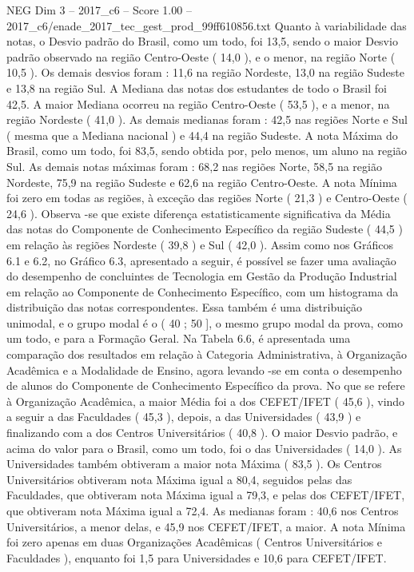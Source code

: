 \begin{textsample}{NEG Dim 3 – 2017\_c6 – Score 1.00 – 2017\_c6/enade\_2017\_tec\_gest\_prod\_99ff610856.txt}
Quanto à variabilidade das notas, o Desvio padrão do Brasil, como um todo, foi 13,5, sendo o maior Desvio padrão observado na região Centro-Oeste ( 14,0 ), e o menor, na região Norte ( 10,5 ).
Os demais desvios foram : 11,6 na região Nordeste, 13,0 na região Sudeste e 13,8 na região Sul.
A Mediana das notas dos estudantes de todo o Brasil foi 42,5.
A maior Mediana ocorreu na região Centro-Oeste ( 53,5 ), e a menor, na região Nordeste ( 41,0 ).
As demais medianas foram : 42,5 nas regiões Norte e Sul ( mesma que a Mediana nacional ) e 44,4 na região Sudeste.
A nota Máxima do Brasil, como um todo, foi 83,5, sendo obtida por, pelo menos, um aluno na região Sul.
As demais notas máximas foram : 68,2 nas regiões Norte, 58,5 na região Nordeste, 75,9 na região Sudeste e 62,6 na região Centro-Oeste.
A nota Mínima foi zero em todas as regiões, à exceção das regiões Norte ( 21,3 ) e Centro-Oeste ( 24,6 ).
Observa -se que existe diferença estatisticamente significativa da Média das notas do Componente de Conhecimento Específico da região Sudeste ( 44,5 ) em relação às regiões Nordeste ( 39,8 ) e Sul ( 42,0 ).
Assim como nos Gráficos 6.1 e 6.2, no Gráfico 6.3, apresentado a seguir, é possível se fazer uma avaliação do desempenho de concluintes de Tecnologia em Gestão da Produção Industrial em relação ao Componente de Conhecimento Específico, com um histograma da distribuição das notas correspondentes.
Essa também é uma distribuição unimodal, e o grupo modal é o ( 40 ; 50 ], o mesmo grupo modal da prova, como um todo, e para a Formação Geral.
Na Tabela 6.6, é apresentada uma comparação dos resultados em relação à Categoria Administrativa, à Organização Acadêmica e a Modalidade de Ensino, agora levando -se em conta o desempenho de alunos do Componente de Conhecimento Específico da prova.
No que se refere à Organização Acadêmica, a maior Média foi a dos CEFET/IFET ( 45,6 ), vindo a seguir a das Faculdades ( 45,3 ), depois, a das Universidades ( 43,9 ) e finalizando com a dos Centros Universitários ( 40,8 ).
O maior Desvio padrão, e acima do valor para o Brasil, como um todo, foi o das Universidades ( 14,0 ).
As Universidades também obtiveram a maior nota Máxima ( 83,5 ).
Os Centros Universitários obtiveram nota Máxima igual a 80,4, seguidos pelas das Faculdades, que obtiveram nota Máxima igual a 79,3, e pelas dos CEFET/IFET, que obtiveram nota Máxima igual a 72,4.
As medianas foram : 40,6 nos Centros Universitários, a menor delas, e 45,9 nos CEFET/IFET, a maior.
A nota Mínima foi zero apenas em duas Organizações Acadêmicas ( Centros Universitários e Faculdades ), enquanto foi 1,5 para Universidades e 10,6 para CEFET/IFET.

\end{textsample}
